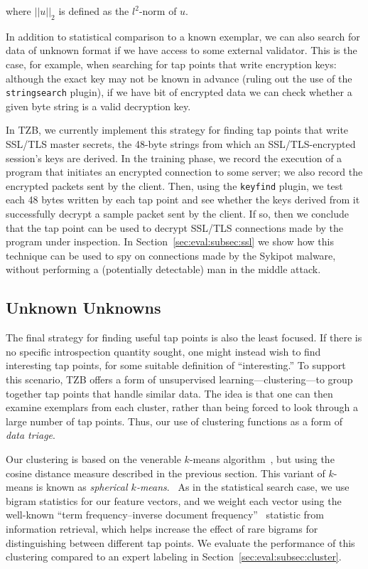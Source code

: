 \noindent where $||u||_2$ is defined as the $l^2$-norm of $u$.

In addition to statistical comparison to a known exemplar, we can also
search for data of unknown format if we have access to some external
validator. This is the case, for example, when searching for tap points
that write encryption keys: although the exact key may not be known in
advance (ruling out the use of the \texttt{stringsearch} plugin), if we
have bit of encrypted data we can check whether a given byte string is a
valid decryption key.

In TZB, we currently implement this strategy for finding tap points that
write SSL/TLS master secrets, the 48-byte strings from which an
SSL/TLS-encrypted session's keys are derived. In the training phase, we
record the execution of a program that initiates an encrypted connection
to some server; we also record the encrypted packets sent by the client.
Then, using the \texttt{keyfind} plugin, we test each 48 bytes written
by each tap point and see whether the keys derived from it successfully
decrypt a sample packet sent by the client. If so, then we conclude that
the tap point can be used to decrypt SSL/TLS connections made by the
program under inspection. In Section~\ref{sec:eval:subsec:ssl} we show
how this technique can be used to spy on connections made by the Sykipot
malware, without performing a (potentially detectable) man in the middle
attack.

\subsection{Unknown Unknowns}

The final strategy for finding useful tap points is also the least
focused. If there is no specific introspection quantity sought, one
might instead wish to find interesting tap points, for some suitable
definition of ``interesting.'' To support this scenario, TZB offers a
form of unsupervised learning---clustering---to group together tap
points that handle similar data. The idea is that one can then examine
exemplars from each cluster, rather than being forced to look through a
large number of tap points. Thus, our use of clustering functions as a
form of \emph{data triage}.

Our clustering is based on the venerable $k$-means
algorithm~\cite{Steinhaus:1956kx}, but using the cosine distance measure
described in the previous section. This variant of $k$-means is known as
\emph{spherical $k$-means}.~\cite{Dhillon:2001fk} As in the statistical
search case, we use bigram statistics for our feature vectors, and we
weight each vector using the well-known ``term frequency–inverse
document frequency''~\cite{Sparck-Jones:1988uq} statistic from
information retrieval, which helps increase the effect of rare bigrams
for distinguishing between different tap points. We evaluate the
performance of this clustering compared to an expert labeling in
Section~\ref{sec:eval:subsec:cluster}.
